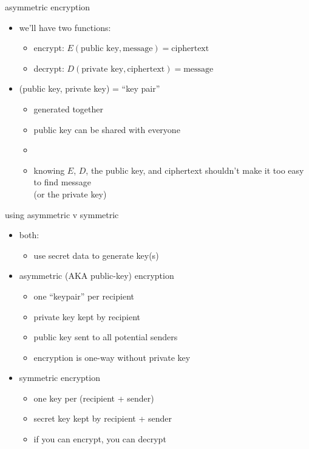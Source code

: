 \begin{frame}{asymmetric encryption}
\begin{itemize}
\item we'll have two functions:
    \begin{itemize}
    \item encrypt: $E(\text{public key}, \text{message}) = \text{ciphertext}$
    \item decrypt: $D(\text{private key}, \text{ciphertext}) = \text{message}$
    \end{itemize}
\item (public key, private key) = ``key pair''
    \begin{itemize}
    \item generated together
    \item public key can be shared with everyone
    \item {}
    \item knowing $E$, $D$, the public key, and ciphertext shouldn't make it too easy to find message \\
        (or the private key)
    \end{itemize}
\end{itemize}
\end{frame}

\begin{frame}{using asymmetric v symmetric}
\begin{itemize}
    \item both:
        \begin{itemize}
            \item use secret data to generate key(s)
        \end{itemize}
    \item asymmetric (AKA public-key) encryption
        \begin{itemize}
            \item one ``keypair'' per recipient
            \item private key kept by recipient
            \item public key sent to all potential senders
            \item encryption is one-way without private key
        \end{itemize}
    \item symmetric encryption
        \begin{itemize}
            \item one key per (recipient + sender)
            \item secret key kept by recipient + sender
            \item if you can encrypt, you can decrypt
        \end{itemize}
\end{itemize}
\end{frame}


